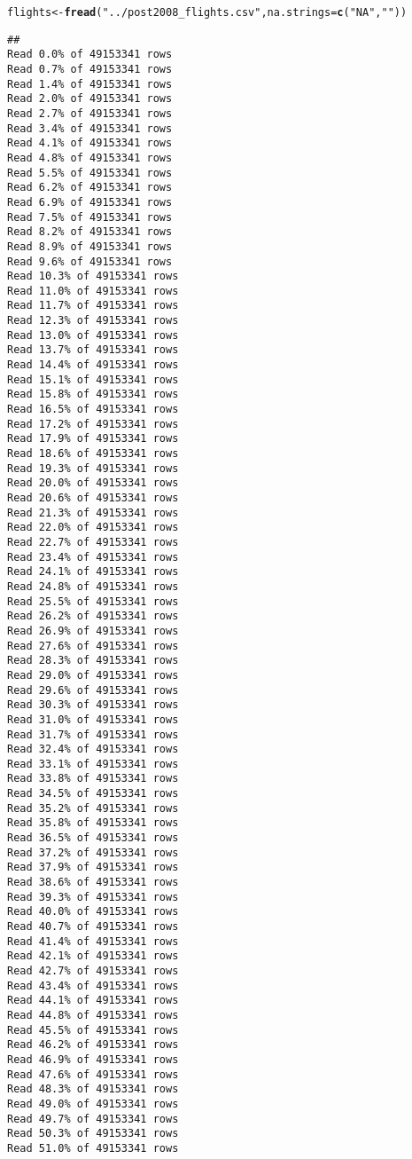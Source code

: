 \documentclass{scrreprt}\usepackage[]{graphicx}\usepackage[]{color}
\makeatletter
\newcommand{\hlstr}[1]{\textcolor[rgb]{0.192,0.494,0.8}{#1}}%
\newcommand{\hlstd}[1]{\textcolor[rgb]{0.345,0.345,0.345}{#1}}%
\newcommand{\hlkwb}[1]{\textcolor[rgb]{0.69,0.353,0.396}{#1}}%
\newcommand{\hlkwc}[1]{\textcolor[rgb]{0.333,0.667,0.333}{#1}}%
\newcommand{\hlkwd}[1]{\textcolor[rgb]{0.737,0.353,0.396}{\textbf{#1}}}%
\newenvironment{kframe}{%
 \def\at@end@of@kframe{}%
 \ifinner\ifhmode%
  \def\at@end@of@kframe{\end{minipage}}%
  \begin{minipage}{\columnwidth}%
 \fi\fi%
 \def\FrameCommand##1{\hskip\@totalleftmargin \hskip-\fboxsep
 \colorbox{shadecolor}{##1}\hskip-\fboxsep
     \hskip-\linewidth \hskip-\@totalleftmargin \hskip\columnwidth}%
 \MakeFramed {\advance\hsize-\width
   \@totalleftmargin\z@ \linewidth\hsize
   \@setminipage}}%
 {\par\unskip\endMakeFramed%
 \at@end@of@kframe}
\newenvironment{knitrout}{}{} %
\makeatother
\begin{document}
\begin{knitrout}
\color{fgcolor}\begin{kframe}
\begin{alltt}
\hlstd{flights} \hlkwb{<-} \hlkwd{fread}\hlstd{(}\hlstr{"../post2008_flights.csv"}\hlstd{,} \hlkwc{na.strings} \hlstd{=} \hlkwd{c}\hlstd{(}\hlstr{"NA"}\hlstd{,} \hlstr{""}\hlstd{))}
\end{alltt}
\begin{verbatim}
## 
Read 0.0% of 49153341 rows
Read 0.7% of 49153341 rows
Read 1.4% of 49153341 rows
Read 2.0% of 49153341 rows
Read 2.7% of 49153341 rows
Read 3.4% of 49153341 rows
Read 4.1% of 49153341 rows
Read 4.8% of 49153341 rows
Read 5.5% of 49153341 rows
Read 6.2% of 49153341 rows
Read 6.9% of 49153341 rows
Read 7.5% of 49153341 rows
Read 8.2% of 49153341 rows
Read 8.9% of 49153341 rows
Read 9.6% of 49153341 rows
Read 10.3% of 49153341 rows
Read 11.0% of 49153341 rows
Read 11.7% of 49153341 rows
Read 12.3% of 49153341 rows
Read 13.0% of 49153341 rows
Read 13.7% of 49153341 rows
Read 14.4% of 49153341 rows
Read 15.1% of 49153341 rows
Read 15.8% of 49153341 rows
Read 16.5% of 49153341 rows
Read 17.2% of 49153341 rows
Read 17.9% of 49153341 rows
Read 18.6% of 49153341 rows
Read 19.3% of 49153341 rows
Read 20.0% of 49153341 rows
Read 20.6% of 49153341 rows
Read 21.3% of 49153341 rows
Read 22.0% of 49153341 rows
Read 22.7% of 49153341 rows
Read 23.4% of 49153341 rows
Read 24.1% of 49153341 rows
Read 24.8% of 49153341 rows
Read 25.5% of 49153341 rows
Read 26.2% of 49153341 rows
Read 26.9% of 49153341 rows
Read 27.6% of 49153341 rows
Read 28.3% of 49153341 rows
Read 29.0% of 49153341 rows
Read 29.6% of 49153341 rows
Read 30.3% of 49153341 rows
Read 31.0% of 49153341 rows
Read 31.7% of 49153341 rows
Read 32.4% of 49153341 rows
Read 33.1% of 49153341 rows
Read 33.8% of 49153341 rows
Read 34.5% of 49153341 rows
Read 35.2% of 49153341 rows
Read 35.8% of 49153341 rows
Read 36.5% of 49153341 rows
Read 37.2% of 49153341 rows
Read 37.9% of 49153341 rows
Read 38.6% of 49153341 rows
Read 39.3% of 49153341 rows
Read 40.0% of 49153341 rows
Read 40.7% of 49153341 rows
Read 41.4% of 49153341 rows
Read 42.1% of 49153341 rows
Read 42.7% of 49153341 rows
Read 43.4% of 49153341 rows
Read 44.1% of 49153341 rows
Read 44.8% of 49153341 rows
Read 45.5% of 49153341 rows
Read 46.2% of 49153341 rows
Read 46.9% of 49153341 rows
Read 47.6% of 49153341 rows
Read 48.3% of 49153341 rows
Read 49.0% of 49153341 rows
Read 49.7% of 49153341 rows
Read 50.3% of 49153341 rows
Read 51.0% of 49153341 rows

\end{verbatim}
\end{kframe}
\end{knitrout}
\end{document}
